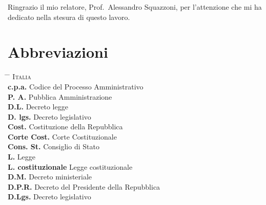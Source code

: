 \documentclass[12pt,it,a4paper,]{report}
\begin{document}
Ringrazio il mio relatore, Prof.~Alessandro Squazzoni, per l'attenzione
che mi ha dedicato nella stesura di questo lavoro.

\newpage


\tableofcontents

\newpage

\hypertarget{abbreviazioni}{%
\chapter*{Abbreviazioni}\label{abbreviazioni}}

\begin{tabbing}
\hspace{12em} \= \hspace{60em} \= \kill
\textsc{Italia} \> \\
\textbf{c.p.a.} \> Codice del Processo Amministrativo \\
\textbf{P. A.} \> Pubblica Amministrazione \\
\textbf{D.L.} \> Decreto legge \\
\textbf{D. lgs.} \> Decreto legislativo \\
\textbf{Cost.} \> Costituzione della Repubblica \\
  \textbf{Corte Cost.} \> Corte Costituzionale \\
  \textbf{Cons. St.} \> Consiglio di Stato \\
\textbf{L.} \> Legge \\
\textbf{L. costituzionale} \> Legge costituzionale \\
\textbf{D.M.} \> Decreto ministeriale \\
\textbf{D.P.R.} \> Decreto del Presidente della Repubblica \\
\textbf{D.Lgs.} \> Decreto legislativo \\


\end{tabbing}
\end{document}
